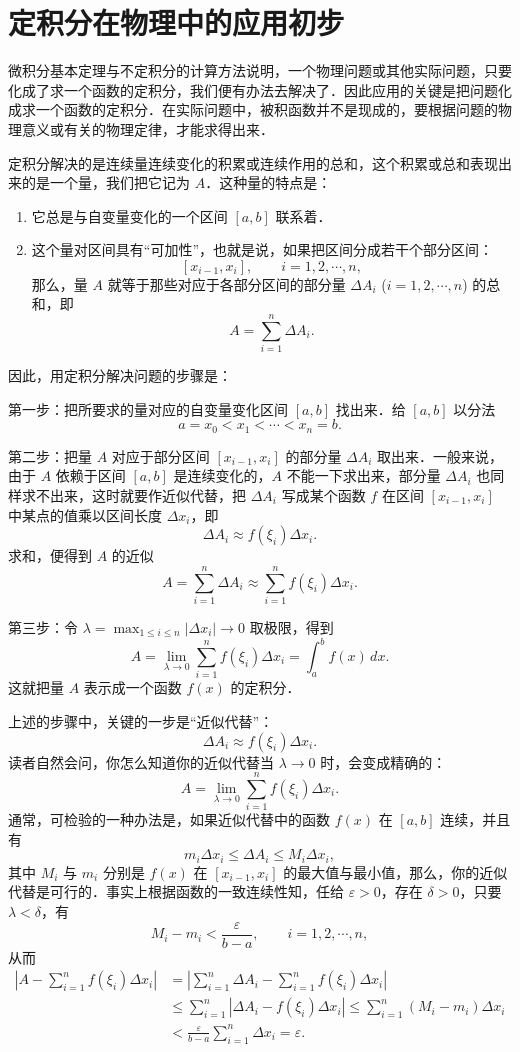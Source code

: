 \section{定积分在物理中的应用初步}\label{sec:7-5}

微积分基本定理与不定积分的计算方法说明，一个物理问题或其他实际问题，只要化成了求一个函数的定积分，我们便有办法去解决了．因此应用的关键是把问题化成求一个函数的定积分．在实际问题中，被积函数并不是现成的，要根据问题的物理意义或有关的物理定律，才能求得出来．

定积分解决的是连续量连续变化的积累或连续作用的总和，这个积累或总和表现出来的是一个量，我们把它记为 $A$．这种量的特点是：
\begin{enumerate}[(1)]
\item 它总是与自变量变化的一个区间 $[a,b]$ 联系着．
\item 这个量对区间具有“可加性”，也就是说，如果把区间分成若干个部分区间：
\[
[x_{i-1}, x_i], \qquad i = 1, 2, \cdots, n,
\]
那么，量 $A$ 就等于那些对应于各部分区间的部分量 $\Delta A_i$ ($i = 1, 2, \cdots, n$) 的总和，即
\[
A = \sum_{i=1}^n \Delta A_i.
\]
\end{enumerate}

因此，用定积分解决问题的步骤是：

第一步：把所要求的量对应的自变量变化区间 $[a,b]$ 找出来．给 $[a,b]$ 以分法
\[
a = x_0 < x_1 < \cdots < x_n = b.
\]

第二步：把量 $A$ 对应于部分区间 $[x_{i-1}, x_i]$ 的部分量 $\Delta A_i$ 取出来．一般来说，由于 $A$ 依赖于区间 $[a,b]$ 是连续变化的，$A$ 不能一下求出来，部分量 $\Delta A_i$ 也同样求不出来，这时就要作近似代替，把 $\Delta A_i$ 写成某个函数 $f$ 在区间 $[x_{i-1}, x_i]$ 中某点的值乘以区间长度 $\Delta x_i$，即
\[
\Delta A_i \approx f(\xi_i)\Delta x_i.
\]
求和，便得到 $A$ 的近似
\[
A = \sum_{i=1}^n \Delta A_i \approx \sum_{i=1}^n f(\xi_i)\Delta x_i.
\]

第三步：令 $\lambda = \max_{1 \leqslant i \leqslant n}|\Delta x_i| \to 0$ 取极限，得到
\[
A = \lim_{\lambda \to 0}\sum_{i=1}^n f(\xi_i)\Delta x_i = \int_a^b f(x)\,dx.
\]
这就把量 $A$ 表示成一个函数 $f(x)$ 的定积分．

上述的步骤中，关键的一步是“近似代替”：
\[
\Delta A_i \approx f(\xi_i)\Delta x_i.
\]
读者自然会问，你怎么知道你的近似代替当 $\lambda \to 0$ 时，会变成精确的：
\[
A = \lim_{\lambda \to 0}\sum_{i=1}^n f(\xi_i)\Delta x_i.
\]
通常，可检验的一种办法是，如果近似代替中的函数 $f(x)$ 在 $[a,b]$ 连续，并且有
\[
m_i \Delta x_i \leqslant \Delta A_i \leqslant M_i \Delta x_i,
\]
其中 $M_i$ 与 $m_i$ 分别是 $f(x)$ 在 $[x_{i-1}, x_i]$ 的最大值与最小值，那么，你的近似代替是可行的．事实上根据函数的一致连续性知，任给 $\varepsilon > 0$，存在 $\delta > 0$，只要 $\lambda < \delta$，有
\[
M_i - m_i < \frac{\varepsilon}{b - a}, \qquad i = 1, 2, \cdots, n,
\]
从而
\begin{align*}
\left|A - \sum_{i=1}^n f(\xi_i)\Delta x_i\right| &= \left|\sum_{i=1}^n \Delta A_i - \sum_{i=1}^n f(\xi_i)\Delta x_i\right| \\
&\leqslant \sum_{i=1}^n |\Delta A_i - f(\xi_i)\Delta x_i| \leqslant \sum_{i=1}^n (M_i - m_i)\Delta x_i \\
&< \frac{\varepsilon}{b - a}\sum_{i=1}^n \Delta x_i = \varepsilon.
\end{align*}

